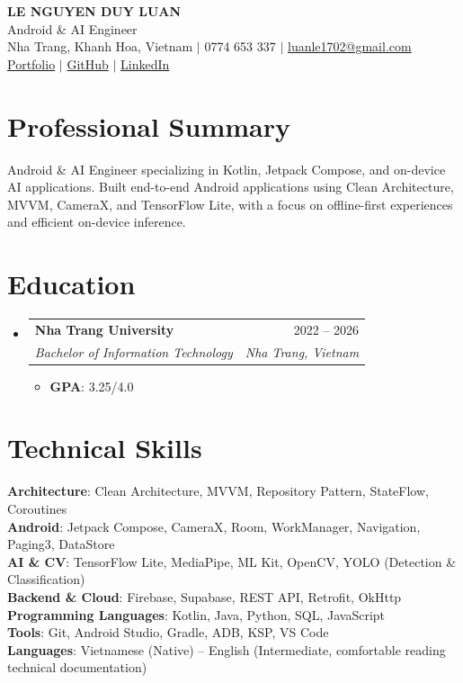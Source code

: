 \documentclass[letterpaper,11pt]{article}
\makeatletter
\newcommand{\resumeItem}[1]{
  \item\small{
    {#1 \vspace{-1pt}}
  }
}
\newcommand{\resumeSubheading}[4]{
  \vspace{-2pt}\item
    \begin{tabular*}{0.97\textwidth}[t]{l@{\extracolsep{\fill}}r}
      \textbf{#1} & #2 \\
      \textit{\small#3} & \textit{\small #4} \\
    \end{tabular*}\vspace{-7pt}
}
\newcommand{\resumeSubHeadingListStart}{\begin{itemize}[leftmargin=0.15in, label={}]}
\newcommand{\resumeSubHeadingListEnd}{\end{itemize}}
\newcommand{\resumeItemListStart}{\begin{itemize}[itemsep=2pt, parsep=0pt, partopsep=0pt]}
\newcommand{\resumeItemListEnd}{\end{itemize}\vspace{-5pt}}
\makeatother
\begin{document}
\begin{center}
    \textbf{\Huge \scshape LE NGUYEN DUY LUAN} \\ \vspace{2pt}
    \small Android \& AI Engineer \\ \vspace{2pt}
    \small Nha Trang, Khanh Hoa, Vietnam $|$ 0774 653 337 $|$ \href{mailto:luanle1702@gmail.com}{luanle1702@gmail.com} \\ \vspace{2pt}
    \small \href{https://duyluan-portfolio-taupe.vercel.app/}{Portfolio} $|$ \href{https://github.com/DuyLuan2107}{GitHub} $|$ \href{https://www.linkedin.com/in/lu\%C3\%A2n-duy-743a39422/}{LinkedIn}
\end{center}

\section{Professional Summary}
\small{Android \& AI Engineer specializing in Kotlin, Jetpack Compose, and on-device AI applications. Built end-to-end Android applications using Clean Architecture, MVVM, CameraX, and TensorFlow Lite, with a focus on offline-first experiences and efficient on-device inference.}

\section{Education}
  \resumeSubHeadingListStart
    \resumeSubheading
      {Nha Trang University}{2022 -- 2026}
      {Bachelor of Information Technology}{Nha Trang, Vietnam}
      \resumeItemListStart
        \resumeItem{\textbf{GPA}: 3.25/4.0}

      \resumeItemListEnd
  \resumeSubHeadingListEnd

\section{Technical Skills}
 \begin{itemize}[leftmargin=0.15in, label={}]
    \small{\item{
     \textbf{Architecture}{: Clean Architecture, MVVM, Repository Pattern, StateFlow, Coroutines} \\
     \textbf{Android}{: Jetpack Compose, CameraX, Room, WorkManager, Navigation, Paging3, DataStore} \\
     \textbf{AI \& CV}{: TensorFlow Lite, MediaPipe, ML Kit, OpenCV, YOLO (Detection \& Classification)} \\
     \textbf{Backend \& Cloud}{: Firebase, Supabase, REST API, Retrofit, OkHttp} \\
     \textbf{Programming Languages}{: Kotlin, Java, Python, SQL, JavaScript} \\
     \textbf{Tools}{: Git, Android Studio, Gradle, ADB, KSP, VS Code} \\
     \textbf{Languages}{: Vietnamese (Native) -- English (Intermediate, comfortable reading technical documentation)}
    }}
 \end{itemize}
\end{document}
